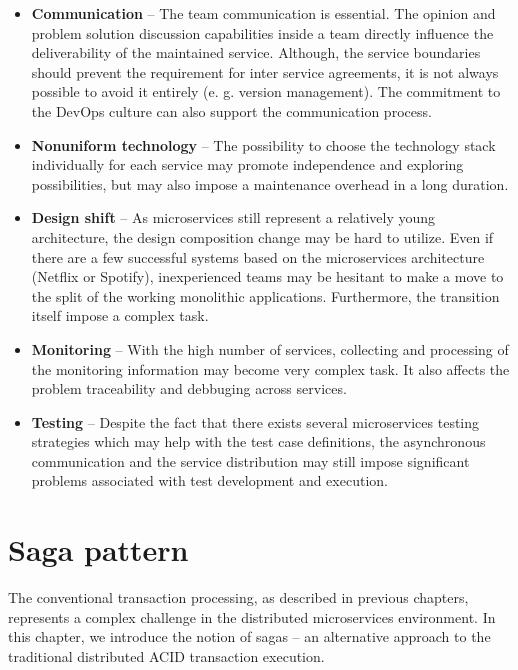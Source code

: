 \documentclass[oneside,
  digital, %
  table,   %
  lof,     %
  lot,     %
]{fithesis3}
\begin{document}
\begin{itemize}
    \item \textbf{Communication} -- The team communication is essential. The opinion and problem solution discussion capabilities inside a team directly influence the deliverability of the maintained service. Although, the service boundaries should prevent the requirement for inter service agreements, it is not always possible to avoid it entirely (e. g. version management). The commitment to the DevOps culture can also support the communication process.
    
    \item \textbf{Nonuniform technology} -- The possibility to choose the technology stack individually for each service may promote independence and exploring possibilities, but may also impose a maintenance overhead in a long duration.  
    
    \item \textbf{Design shift} -- As microservices still represent a relatively young architecture, the design composition change may be hard to utilize. Even if there are a few successful systems based on the microservices architecture (Netflix or Spotify), inexperienced teams may be hesitant to make a move to the split of the working monolithic applications. Furthermore, the transition itself impose a complex task.
    
    \item \textbf{Monitoring} -- With the high number of services, collecting and processing of the monitoring information may become very complex task. It also affects the problem traceability and debbuging across services.
    
    \item \textbf{Testing} -- Despite the fact that there exists several microservices testing strategies \cite{ms_testing_strategies} which may help with the test case definitions, the asynchronous communication and the service distribution may still impose significant problems associated with test development and execution.
\end{itemize}



\clearpage
\chapter{Saga pattern}
\label{sec:saga-pattern}

The conventional transaction processing, as described in previous chapters, represents a complex challenge in the distributed microservices environment. In this chapter, we introduce the notion of sagas -- an alternative approach to the traditional distributed ACID transaction execution.
\end{document}
